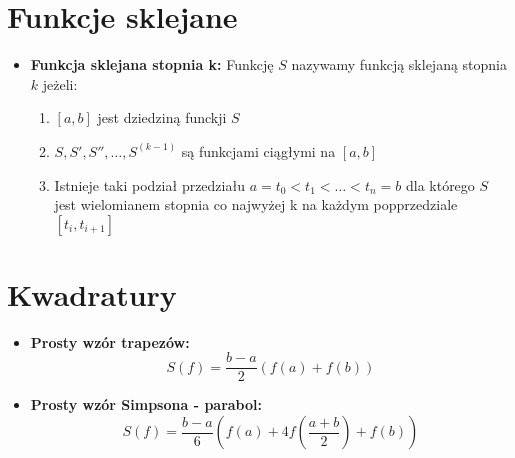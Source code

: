 \documentclass[11pt]{article}
\begin{document}
\section{Funkcje sklejane}
\begin{itemize}
    \item \textbf{Funkcja sklejana stopnia k: }Funkcję $S$ nazywamy funkcją sklejaną stopnia $k$ jeżeli:
    \begin{enumerate}
        \item $[a,b]$ jest dziedziną funckji $S$
        \item $S, S', S'', \dots , S^{(k-1)}$ są funkcjami ciągłymi na $[a,b]$
        \item Istnieje taki podział przedziału $a=t_0<t_1<\dots<t_n=b$ dla którego $S$ jest wielomianem stopnia co najwyżej k na każdym popprzedziale $[t_i, t_{i+1}]$
    \end{enumerate}
\end{itemize}

\section{Kwadratury}
\begin{itemize}
    \item \textbf{Prosty wzór trapezów: }
    \[S(f) = \frac{b-a}{2}(f(a)+f(b))\]
    \item  \textbf{Prosty wzór Simpsona - parabol: }
    \[S(f) = \frac{b-a}{6}(f(a) + 4f(\frac{a+b}{2}) + f(b))\]
\end{itemize}
\end{document}
